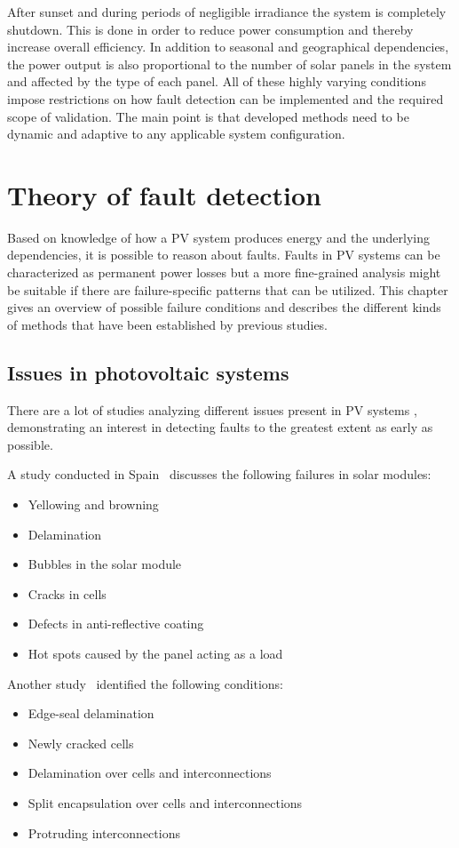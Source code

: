 After sunset and during periods of negligible irradiance the system is completely shutdown.
This is done in order to reduce power consumption and thereby increase overall efficiency.
In addition to seasonal and geographical dependencies, the power output is also proportional to the number of solar panels in the system and affected by the type of each panel.
All of these highly varying conditions impose restrictions on how fault detection can be implemented and the required scope of validation.
The main point is that developed methods need to be dynamic and adaptive to any applicable system configuration.

\chapter{Theory of fault detection}
Based on knowledge of how a PV system produces energy and the underlying dependencies,
it is possible to reason about faults.
Faults in PV systems can be characterized as permanent power losses but a more fine-grained analysis might be suitable if there are failure-specific patterns that can be utilized.
This chapter gives an overview of possible failure conditions and describes the different kinds of methods that have been established by previous studies.

\section{Issues in photovoltaic systems}
There are a lot of studies analyzing different issues present in PV systems \cite{Baltus1997,King2002,Petrone2008}, demonstrating an interest in detecting faults to the greatest extent as early as possible.

A study conducted in Spain~\cite{Munoz2011} discusses the following failures in solar modules:
\begin{itemize}
\item Yellowing and browning
\item Delamination
\item Bubbles in the solar module
\item Cracks in cells
\item Defects in anti-reflective coating
\item Hot spots caused by the panel acting as a load
\end{itemize}

Another study~\cite{Forman1982} identified the following conditions:
\begin{itemize}
\item Edge-seal delamination
\item Newly cracked cells
\item Delamination over cells and interconnections
\item Split encapsulation over cells and interconnections
\item Protruding interconnections
\end{itemize}

